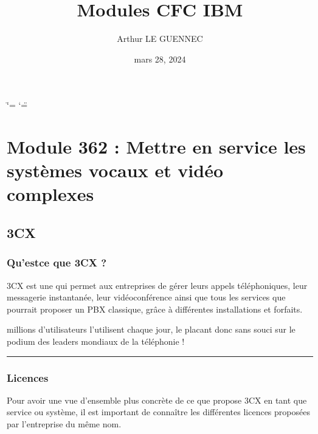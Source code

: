 \documentclass[letterpaper,10pt,french]{sphinxmanual}
\title{Modules CFC IBM}
\date{mars 28, 2024}
\author{Arthur LE GUENNEC}
\let\sphinxpxdimen\pdfpxdimen\else\newdimen\sphinxpxdimen
\begin{document}
\ifdefined\shorthandoff
  \ifnum\catcode`\=\string=\active\shorthandoff{=}\fi
  \ifnum\catcode`\"=\active{}\fi
\fi

\pagestyle{empty}
\sphinxmaketitle
\pagestyle{plain}
\sphinxtableofcontents
\pagestyle{normal}
\label{\detokenize{index::doc}}


\sphinxstepscope


\chapter{Module 362 : Mettre en service les systèmes vocaux et vidéo complexes}
\label{\detokenize{Documentation-M362:module-362-mettre-en-service-les-systemes-vocaux-et-video-complexes}}\label{\detokenize{Documentation-M362::doc}}
\noindent{\hspace*{\fill}\sphinxincludegraphics[height=32\sphinxpxdimen]{{3CX_Logo_-_Wiki}.png}}


\section{3CX}
\label{\detokenize{Documentation-M362:cx}}

\subsection{Qu’est\sphinxhyphen{}ce que 3CX ?}
\label{\detokenize{Documentation-M362:qu-est-ce-que-3cx}}
\sphinxAtStartPar
3CX est une  qui permet aux entreprises de gérer leurs appels téléphoniques, leur messagerie instantanée, leur vidéoconférence ainsi que tous les services que pourrait proposer un PBX classique, grâce à différentes installations et forfaits.

 millions d’utilisateurs l’utilisent chaque jour, le placant donc sans souci sur le podium des leaders mondiaux de la téléphonie !



\bigskip\hrule\bigskip



\subsection{Licences}
\label{\detokenize{Documentation-M362:licences}}
\sphinxAtStartPar
Pour avoir une vue d’ensemble plus concrète de ce que propose 3CX en tant que service ou système, il est important de connaître les différentes licences proposées par l’entreprise du même nom.
\end{document}
